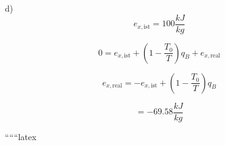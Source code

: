 d)
\[
e_{x, \text{ist}} = 100 \frac{kJ}{kg}
\]

\[
0 = e_{x, \text{ist}} + \left( 1 - \frac{T_0}{T} \right) q_B + e_{x, \text{real}}
\]

\[
e_{x, \text{real}} = -e_{x, \text{ist}} + \left( 1 - \frac{T_0}{T} \right) q_B
\]

\[
= -69.58 \frac{kJ}{kg}
\]

``````latex